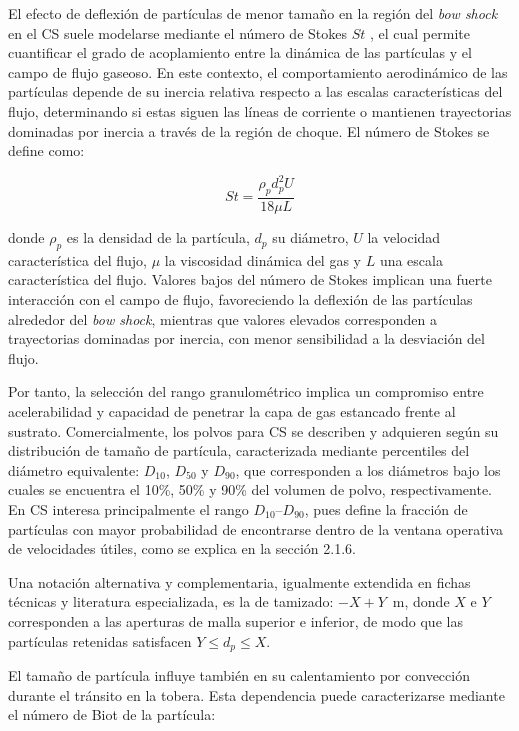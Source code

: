 El efecto de deflexión de partículas de menor tamaño en la región del \textit{bow shock} en el CS suele modelarse mediante el número de Stokes $St$ \cite{Assadi2003}, el cual permite cuantificar el grado de acoplamiento entre la dinámica de las partículas y el campo de flujo gaseoso. En este contexto, el comportamiento aerodinámico de las partículas depende de su inercia relativa respecto a las escalas características del flujo, determinando si estas siguen las líneas de corriente o mantienen trayectorias dominadas por inercia a través de la región de choque. El número de Stokes se define como:

\begin{equation}
	St = \frac{\rho_p d_p^2 U}{18 \mu L}
\end{equation}

donde $\rho_p$ es la densidad de la partícula, $d_p$ su diámetro, $U$ la velocidad característica del flujo, $\mu$ la viscosidad dinámica del gas y $L$ una escala característica del flujo. Valores bajos del número de Stokes implican una fuerte interacción con el campo de flujo, favoreciendo la deflexión de las partículas alrededor del \textit{bow shock}, mientras que valores elevados corresponden a trayectorias dominadas por inercia, con menor sensibilidad a la desviación del flujo.

Por tanto, la selección del rango granulométrico implica un compromiso
entre acelerabilidad y capacidad de penetrar la capa de gas estancado
frente al sustrato. Comercialmente, los polvos para CS se describen y
adquieren según su distribución de tamaño de partícula, caracterizada
mediante percentiles del diámetro equivalente: $D_{10}$, $D_{50}$ y
$D_{90}$, que corresponden a los diámetros bajo los cuales se encuentra
el 10\%, 50\% y 90\% del volumen de polvo, respectivamente. En CS interesa principalmente el rango
$D_{10}$--$D_{90}$, pues define la fracción de partículas con mayor
probabilidad de encontrarse dentro de la ventana operativa de velocidades
útiles, como se explica en la sección 2.1.6.

Una notación
alternativa y complementaria, igualmente extendida en fichas técnicas y literatura
especializada, es la de tamizado: $-X{+}Y$~\textmu m, donde $X$ e $Y$
corresponden a las aperturas de malla superior e inferior, de modo que
las partículas retenidas satisfacen $Y \leq d_p \leq X$. 

El tamaño de partícula influye también en su calentamiento por convección
durante el tránsito en la tobera. Esta dependencia puede caracterizarse
mediante el número de Biot de la partícula:

